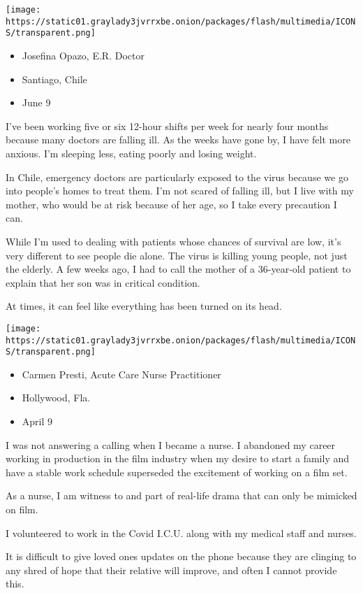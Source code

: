 \texttt{[image: https://static01.graylady3jvrrxbe.onion/packages/flash/multimedia/ICONS/transparent.png]}

\begin{itemize}
\tightlist
\item
  Josefina Opazo, E.R. Doctor
\item
  Santiago, Chile
\item
  June 9
\end{itemize}

I've been working five or six 12-hour shifts per week for nearly four
months because many doctors are falling ill. As the weeks have gone by,
I have felt more anxious. I'm sleeping less, eating poorly and losing
weight.

In Chile, emergency doctors are particularly exposed to the virus
because we go into people's homes to treat them. I'm not scared of
falling ill, but I live with my mother, who would be at risk because of
her age, so I take every precaution I can.

While I'm used to dealing with patients whose chances of survival are
low, it's very different to see people die alone. The virus is killing
young people, not just the elderly. A few weeks ago, I had to call the
mother of a 36-year-old patient to explain that her son was in critical
condition.

At times, it can feel like everything has been turned on its head.

\texttt{[image: https://static01.graylady3jvrrxbe.onion/packages/flash/multimedia/ICONS/transparent.png]}

\begin{itemize}
\tightlist
\item
  Carmen Presti, Acute Care Nurse Practitioner
\item
  Hollywood, Fla.
\item
  April 9
\end{itemize}

I was not answering a calling when I became a nurse. I abandoned my
career working in production in the film industry when my desire to
start a family and have a stable work schedule superseded the excitement
of working on a film set.

As a nurse, I am witness to and part of real-life drama that can only be
mimicked on film.

I volunteered to work in the Covid I.C.U. along with my medical staff
and nurses.

It is difficult to give loved ones updates on the phone because they are
clinging to any shred of hope that their relative will improve, and
often I cannot provide this.

